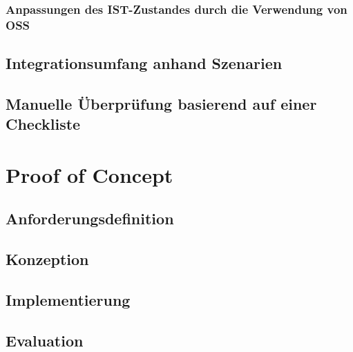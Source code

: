 \documentclass[12pt,titlepage]{report}
\begin{document}
\subsection{Anpassungen des IST-Zustandes durch die Verwendung von OSS}


\section{Integrationsumfang anhand Szenarien}


\section{Manuelle Überprüfung basierend auf einer Checkliste}


\chapter{Proof of Concept}


\section{Anforderungsdefinition}

\section{Konzeption}

\section{Implementierung}

\section{Evaluation}


\end{document}
